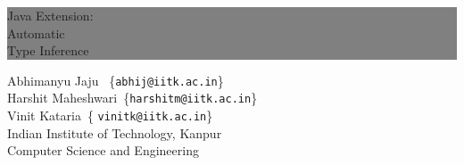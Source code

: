 \thispagestyle{empty} %


\colorbox{grey}{
	\parbox[t]{1.0\linewidth}{
		\centering \fontsize{50pt}{80pt}\selectfont %
		\vspace*{0.7cm} %
		
		\hfill Java Extension:\\
		\hfill Automatic \\
		\hfill Type Inference\\
		
		\vspace*{0.7cm} %
	}
}


\vfill %


{\centering \large 
\hfill Abhimanyu Jaju \ \{\texttt{abhij@iitk.ac.in}\}\\
\hfill Harshit Maheshwari\ \{\texttt{harshitm@iitk.ac.in}\}\\
\hfill Vinit Kataria\ \{ \texttt{vinitk@iitk.ac.in}\}\\
\hfill Indian Institute of Technology, Kanpur \\
\hfill Computer Science and Engineering\\

\HRule{1pt}} %


\clearpage %
